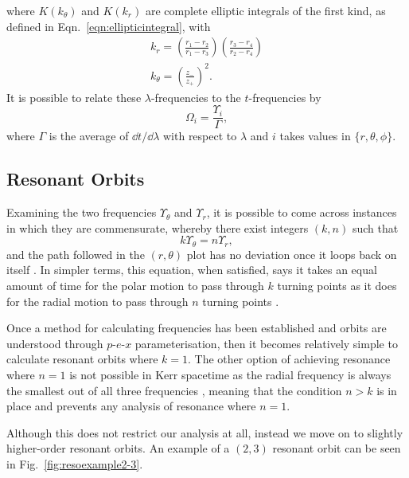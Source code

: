 where $K(k_\theta)$ and $K(k_r)$ are complete elliptic integrals of the first kind, as defined in Eqn.~\eqref{eqn:ellipticintegral}, with
\begin{gather}
k_r=\left(\frac{r_1-r_2}{r_1-r_3}\right)\left(\frac{r_3-r_4}{r_2-r_4}\right)\\
k_\theta=\left(\frac{z_-}{z_+} \right)^2.
\end{gather}
It is possible to relate these $\lambda$-frequencies to the $t$-frequencies by
\begin{equation}
\Omega_i=\frac{\Upsilon_i}{\Gamma},
\end{equation}
where $\Gamma$ is the average of $\dd{t}/\dd{\lambda}$ with respect to $\lambda$ and $i$ takes values in $\{r,\theta,\phi\}$.


\subsection{Resonant Orbits}
Examining the two frequencies $\Upsilon_\theta$ and $\Upsilon_r$, it is possible to come across instances in which they are commensurate, whereby there exist integers $(k,n)$ such that
\begin{equation}\label{eqn:resCond}
    k\Upsilon_\theta=n\Upsilon_r,
\end{equation}
and the path followed in the $(r,\theta)$ plot has no deviation once it loops back on itself \cite{ResonantCensus}.
In simpler terms, this equation, when satisfied, says it takes an equal amount of time for the polar motion to pass through $k$ turning points as it does for the radial motion to pass through $n$ turning points \cite{brinkKerrResonance}. 

Once a method for calculating frequencies has been established and orbits are understood through $p$-$e$-$x$ parameterisation, then it becomes relatively simple to calculate resonant orbits where $k=1$.
The other option of achieving resonance where $n=1$ is not possible in Kerr spacetime as the radial frequency is always the smallest out of all three frequencies \cite{brinkKerrResonance}, meaning that the condition $n>k$ is in place and prevents any analysis of resonance where $n=1$.

Although this does not restrict our analysis at all, instead we move on to slightly higher-order resonant orbits.
An example of a $(2,3)$ resonant orbit can be seen in Fig.~\eqref{fig:resoexample2-3}.


